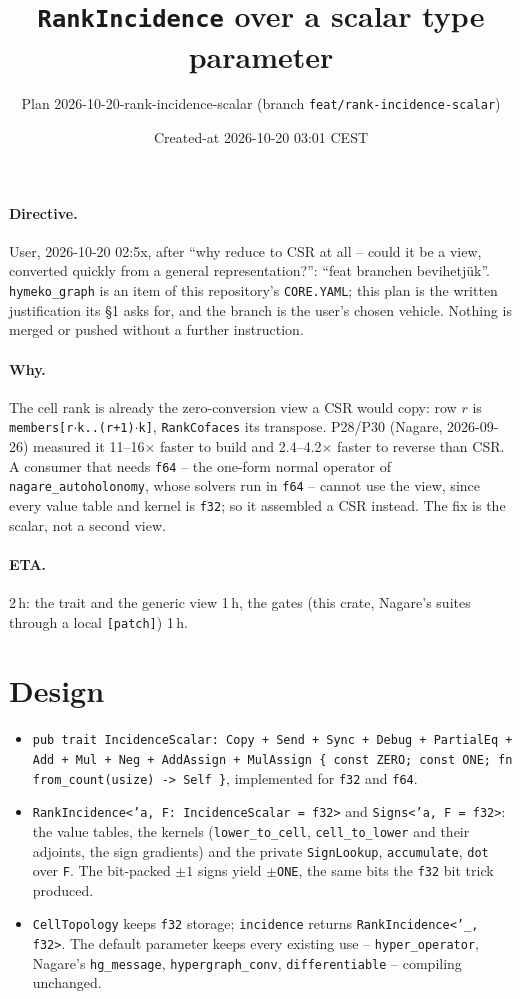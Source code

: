 \documentclass[11pt,a4paper]{article}
\title{\texttt{RankIncidence} over a scalar type parameter}
\author{Plan 2026-10-20-rank-incidence-scalar (branch \texttt{feat/rank-incidence-scalar})}
\date{Created-at 2026-10-20 03:01 CEST}
\begin{document}
\sloppy
\maketitle
\paragraph{Directive.} User, 2026-10-20 02:5x, after ``why reduce to CSR at all -- could it be a view, converted
quickly from a general representation?'': ``feat branchen bevihetj\"uk''. \texttt{hymeko\_graph} is an item of this
repository's \texttt{CORE.YAML}; this plan is the written justification its \S1 asks for, and the branch is the
user's chosen vehicle. Nothing is merged or pushed without a further instruction.

\paragraph{Why.} The cell rank is already the zero-conversion view a CSR would copy: row $r$ is
\texttt{members[r$\cdot$k..(r+1)$\cdot$k]}, \texttt{RankCofaces} its transpose. P28/P30 (Nagare, 2026-09-26) measured
it 11--16$\times$ faster to build and 2.4--4.2$\times$ faster to reverse than CSR. A consumer that needs \texttt{f64}
-- the one-form normal operator of \texttt{nagare\_autoholonomy}, whose solvers run in \texttt{f64} -- cannot use the
view, since every value table and kernel is \texttt{f32}; so it assembled a CSR instead. The fix is the scalar, not a
second view.

\paragraph{ETA.} 2\,h: the trait and the generic view 1\,h, the gates (this crate, Nagare's suites through a local
\texttt{[patch]}) 1\,h.

\section{Design}
\begin{itemize}
\item \texttt{pub trait IncidenceScalar: Copy + Send + Sync + Debug + PartialEq + Add + Mul + Neg + AddAssign +
  MulAssign \{ const ZERO; const ONE; fn from\_count(usize) -> Self \}}, implemented for \texttt{f32} and \texttt{f64}.
\item \texttt{RankIncidence<'a, F: IncidenceScalar = f32>} and \texttt{Signs<'a, F = f32>}: the value tables, the
  kernels (\texttt{lower\_to\_cell}, \texttt{cell\_to\_lower} and their adjoints, the sign gradients) and the private
  \texttt{SignLookup}, \texttt{accumulate}, \texttt{dot} over \texttt{F}. The bit-packed $\pm1$ signs yield
  $\pm$\texttt{ONE}, the same bits the \texttt{f32} bit trick produced.
\item \texttt{CellTopology} keeps \texttt{f32} storage; \texttt{incidence} returns \texttt{RankIncidence<'\_, f32>}.
  The default parameter keeps every existing use -- \texttt{hyper\_operator}, Nagare's \texttt{hg\_message},
  \texttt{hypergraph\_conv}, \texttt{differentiable} -- compiling unchanged.
\end{itemize}
\end{document}

